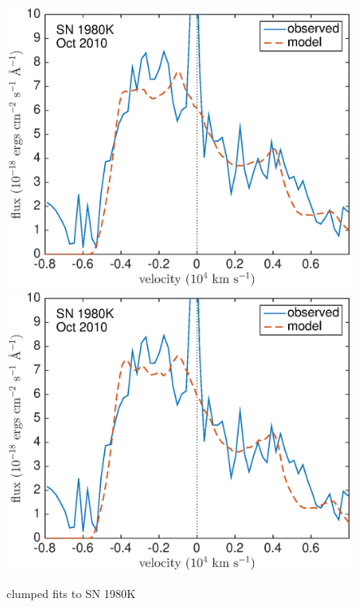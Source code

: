 \begin{figure}
\includegraphics[scale=0.4,clip=true, trim=20 0 40 20]{chapters/chapter6/figs/80K/clumped/OI}
\includegraphics[scale=0.4,clip=true, trim=20 0 40 20]{chapters/chapter6/figs/80K/clumped/OI_amC}
\caption{clumped fits to SN 1980K}
\label{80K_clumped}
\end{figure}


